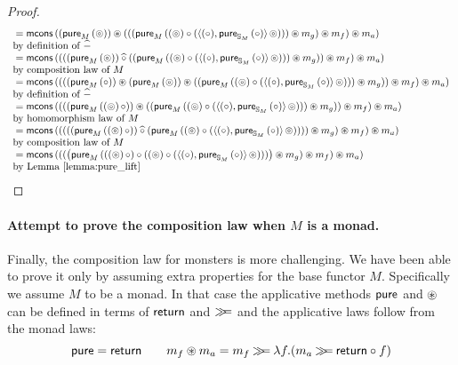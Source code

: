\begin{lemma}
\begin{proof}
$$\begin{array}{ll}
{}= \mathsf{mcons}\, ( (\mathsf{pure}_M\,(\circledcirc)) \circledast (((\mathsf{pure}_M\,((\circledcirc) \circ (\langle (\circ), \mathsf{pure}_{\mathbb{S}_{M}}\,(\circ) \rangle\, \circledcirc))) \circledast m_g) \circledast m_f) \circledast m_a)\\
\mbox{by definition of }\mathbin{\widehat{-}}\\
{}= \mathsf{mcons}\, ( ( ((\mathsf{pure}_M\,(\circledcirc)) \mathbin{\widehat{\circ}} ((\mathsf{pure}_M\,((\circledcirc) \circ (\langle (\circ), \mathsf{pure}_{\mathbb{S}_{M}}\,(\circ) \rangle\, \circledcirc))) \circledast m_g)) \circledast m_f) \circledast m_a) \\
\mbox{by composition law of }M\\
{}= \mathsf{mcons}\, ( ( ( (\mathsf{pure}_M\,(\circ)) \circledast (\mathsf{pure}_M\,(\circledcirc)) \circledast ((\mathsf{pure}_M\,((\circledcirc) \circ (\langle (\circ), \mathsf{pure}_{\mathbb{S}_{M}}\,(\circ) \rangle\, \circledcirc))) \circledast m_g)) \circledast m_f) \circledast m_a) \\
\mbox{by definition of }\mathbin{\widehat{-}}\\
{}= \mathsf{mcons}\, ( ( ( (\mathsf{pure}_M\,((\circledcirc)\, \circ)) \circledast ((\mathsf{pure}_M\,((\circledcirc) \circ (\langle (\circ), \mathsf{pure}_{\mathbb{S}_{M}}\,(\circ) \rangle\, \circledcirc))) \circledast m_g) ) \circledast m_f) \circledast m_a) \\
 \mbox{by homomorphism law of }M\\
 {}= \mathsf{mcons}\, ( ( ( ( (\mathsf{pure}_M\,((\circledcirc)\, \circ)) \mathbin{\widehat{\circ}} (\mathsf{pure}_M\,((\circledcirc) \circ (\langle (\circ), \mathsf{pure}_{\mathbb{S}_{M}}\,(\circ) \rangle\, \circledcirc)))  ) \circledast m_g ) \circledast m_f) \circledast m_a) \\
\mbox{by composition law of }M\\
 {}= \mathsf{mcons}\, ( ( ( \big(\mathsf{pure}_M\,(((\circledcirc)\, \circ) \circ ((\circledcirc) \circ (\langle (\circ), \mathsf{pure}_{\mathbb{S}_{M}}\,(\circ) \rangle\, \circledcirc)))\big) \circledast m_g ) \circledast m_f) \circledast m_a) \\
\mbox{by Lemma \ref{lemma:pure_lift}}\\
\end{array}
$$
\end{proof}
\end{lemma}










\paragraph{Attempt to prove the composition law when $M$ is a monad.}

Finally, the composition law for monsters is more challenging.
We have been able to prove it only by assuming extra properties for the base functor $M$.
Specifically we assume $M$ to be a monad.
In that case the applicative methods $\mathsf{pure}$ and $\circledast$ can be defined in terms of $\mathsf{return}$ and $\mathbin{\gg\!\!=}$ and the applicative laws follow from the monad laws:
$$
\mathsf{pure} = \mathsf{return}
\qquad
m_f \circledast m_a = m_f \mathbin{\gg\!\!=} \lambda f. (m_a \mathbin{\gg\!\!=} \mathsf{return}\circ f)
$$

